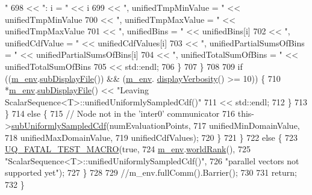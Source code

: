 \begin{DoxyCode}
{      "}
698                                   << \textcolor{stringliteral}{": i = "} << i
699                                   << \textcolor{stringliteral}{", unifiedTmpMinValue = "}       << unifiedTmpMinValue
700                                   << \textcolor{stringliteral}{", unifiedTmpMaxValue = "}       << unifiedTmpMaxValue
701                                   << \textcolor{stringliteral}{", unifiedBins = "}              << unifiedBins[i]
702                                   << \textcolor{stringliteral}{", unifiedCdfValue = "}          << unifiedCdfValues[i]
703                                   << \textcolor{stringliteral}{", unifiedPartialSumsOfBins = "} << unifiedPartialSumsOfBins[i]
704                                   << \textcolor{stringliteral}{", unifiedTotalSumOfBins = "}    << unifiedTotalSumOfBins
705                                   << std::endl;
706         \}
707       \}
708 
709       \textcolor{keywordflow}{if} ((\hyperlink{class_q_u_e_s_o_1_1_scalar_sequence_a71618cd6351b29361b437af68447a4c8}{m\_env}.\hyperlink{class_q_u_e_s_o_1_1_base_environment_a8a0064746ae8dddfece4229b9ad374d6}{subDisplayFile}()) && (\hyperlink{class_q_u_e_s_o_1_1_scalar_sequence_a71618cd6351b29361b437af68447a4c8}{m\_env}.
      \hyperlink{class_q_u_e_s_o_1_1_base_environment_a1fe5f244fc0316a0ab3e37463f108b96}{displayVerbosity}() >= 10)) \{
710         *\hyperlink{class_q_u_e_s_o_1_1_scalar_sequence_a71618cd6351b29361b437af68447a4c8}{m\_env}.\hyperlink{class_q_u_e_s_o_1_1_base_environment_a8a0064746ae8dddfece4229b9ad374d6}{subDisplayFile}() << \textcolor{stringliteral}{"Leaving
       ScalarSequence<T>::unifiedUniformlySampledCdf()"}
711                                 << std::endl;
712       \}
713     \}
714     \textcolor{keywordflow}{else} \{
715       \textcolor{comment}{// Node not in the 'inter0' communicator}
716       this->\hyperlink{class_q_u_e_s_o_1_1_scalar_sequence_a58405305f35483e422012f986eb06aa1}{subUniformlySampledCdf}(numEvaluationPoints,
717                                    unifiedMinDomainValue,
718                                    unifiedMaxDomainValue,
719                                    unifiedCdfValues);
720     \}
721   \}
722   \textcolor{keywordflow}{else} \{
723     \hyperlink{_defines_8h_a56d63d18d0a6d45757de47fcc06f574d}{UQ\_FATAL\_TEST\_MACRO}(\textcolor{keyword}{true},
724                         \hyperlink{class_q_u_e_s_o_1_1_scalar_sequence_a71618cd6351b29361b437af68447a4c8}{m\_env}.\hyperlink{class_q_u_e_s_o_1_1_base_environment_a78b57112bbd0e6dd0e8afec00b40ffa7}{worldRank}(),
725                         \textcolor{stringliteral}{"ScalarSequence<T>::unifiedUniformlySampledCdf()"},
726                         \textcolor{stringliteral}{"parallel vectors not supported yet"});
727   \}
728 
729   \textcolor{comment}{//m\_env.fullComm().Barrier();}
730 
731   \textcolor{keywordflow}{return};
732 \}
\end{DoxyCode}
